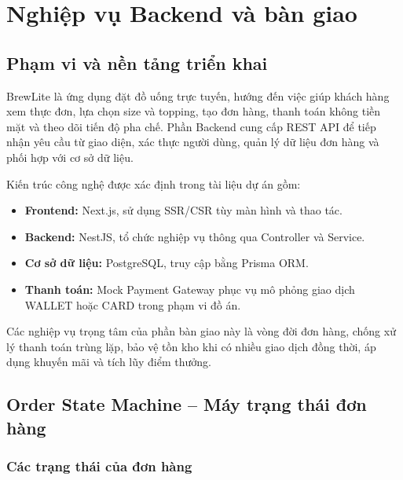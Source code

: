
\chapter{Nghiệp vụ Backend và bàn giao}
\label{chap:backend-handover}

\section{Phạm vi và nền tảng triển khai}

BrewLite là ứng dụng đặt đồ uống trực tuyến, hướng đến việc giúp khách hàng xem thực đơn, lựa chọn size và topping, tạo đơn hàng, thanh toán không tiền mặt và theo dõi tiến độ pha chế. Phần Backend cung cấp REST API để tiếp nhận yêu cầu từ giao diện, xác thực người dùng, quản lý dữ liệu đơn hàng và phối hợp với cơ sở dữ liệu.

Kiến trúc công nghệ được xác định trong tài liệu dự án gồm:
\begin{itemize}
    \item \textbf{Frontend:} Next.js, sử dụng SSR/CSR tùy màn hình và thao tác.
    \item \textbf{Backend:} NestJS, tổ chức nghiệp vụ thông qua Controller và Service.
    \item \textbf{Cơ sở dữ liệu:} PostgreSQL, truy cập bằng Prisma ORM.
    \item \textbf{Thanh toán:} Mock Payment Gateway phục vụ mô phỏng giao dịch WALLET hoặc CARD trong phạm vi đồ án.
\end{itemize}

Các nghiệp vụ trọng tâm của phần bàn giao này là vòng đời đơn hàng, chống xử lý thanh toán trùng lặp, bảo vệ tồn kho khi có nhiều giao dịch đồng thời, áp dụng khuyến mãi và tích lũy điểm thưởng.

\section{Order State Machine -- Máy trạng thái đơn hàng}
\label{sec:order-state-machine}

\subsection{Các trạng thái của đơn hàng}

